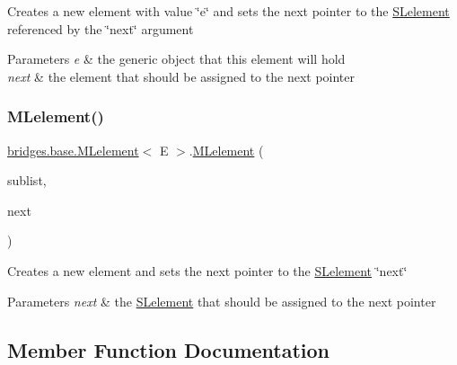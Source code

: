 Creates a new element with value \char`\"{}e\char`\"{} and sets the next pointer to the \mbox{\hyperlink{classbridges_1_1base_1_1_s_lelement}{S\+Lelement}} referenced by the \char`\"{}next\char`\"{} argument


\begin{DoxyParams}{Parameters}
{\em e} & the generic object that this element will hold \\
\hline
{\em next} & the element that should be assigned to the next pointer \\
\hline
\end{DoxyParams}
\mbox{\label{classbridges_1_1base_1_1_m_lelement_aa660281523a7de140a0b17737096a332}} 
\subsubsection{\texorpdfstring{MLelement()}{MLelement()}\hspace{0.1cm}{\footnotesize\ttfamily [4/4]}}
{\footnotesize\ttfamily \mbox{\hyperlink{classbridges_1_1base_1_1_m_lelement}{bridges.\+base.\+M\+Lelement}}$<$ E $>$.\mbox{\hyperlink{classbridges_1_1base_1_1_m_lelement}{M\+Lelement}} (\begin{DoxyParamCaption}\item[{\mbox{\hyperlink{classbridges_1_1base_1_1_m_lelement}{M\+Lelement}}$<$ E $>$}]{sublist,  }\item[{\mbox{\hyperlink{classbridges_1_1base_1_1_m_lelement}{M\+Lelement}}$<$ E $>$}]{next }\end{DoxyParamCaption})}

Creates a new element and sets the next pointer to the \mbox{\hyperlink{classbridges_1_1base_1_1_s_lelement}{S\+Lelement}} \char`\"{}next\char`\"{} 
\begin{DoxyParams}{Parameters}
{\em next} & the \mbox{\hyperlink{classbridges_1_1base_1_1_s_lelement}{S\+Lelement}} that should be assigned to the next pointer \\
\hline
\end{DoxyParams}


\subsection{Member Function Documentation}
\mbox{\label{classbridges_1_1base_1_1_m_lelement_aa2e26697e2c70a36b8345a324d00679a}} 

